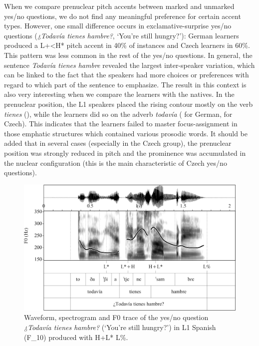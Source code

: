 When we compare prenuclear pitch accents between marked and unmarked yes/no questions, we do not find any meaningful preference for certain accent types. However, one small difference occurs in exclamative-surprise yes/no questions (\textit{¿Todavía tienes hambre?}, ‘You’re still hungry?’): German learners produced a L+<H* pitch accent in 40\% of instances and Czech learners in 60\%. This pattern was less common in the rest of the yes/no questions. In general, the sentence \textit{Todavía tienes hambre} revealed the largest inter-speaker variation, which can be linked to the fact that the speakers had more choices or preferences with regard to which part of the sentence to emphasize. The result in this context is also very interesting when we compare the learners with the natives. In the prenuclear position, the L1 speakers placed the rising contour mostly on the verb \textit{tienes} (), while the learners did so on the adverb \textit{todavía} ( for German,  for Czech). This indicates that the learners failed to master focus-assignment in those emphatic structures which contained various prosodic words. It should be added that in several cases (especially in the Czech group), the prenuclear position was strongly reduced in pitch and the prominence was accumulated in the nuclear configuration (this is the main characteristic of Czech yes/no questions).

\begin{figure}


\includegraphics[width=\textwidth]{figures/Figure_4.69.png}



\caption{Waveform, spectrogram and F0 trace of the yes/no question \textit{¿Todavía tienes hambre?} (‘You’re still hungry?’) in L1 Spanish \mbox{(F\_10)} produced with H+L* L\%.}
\label{fig:4.69}
\end{figure}

